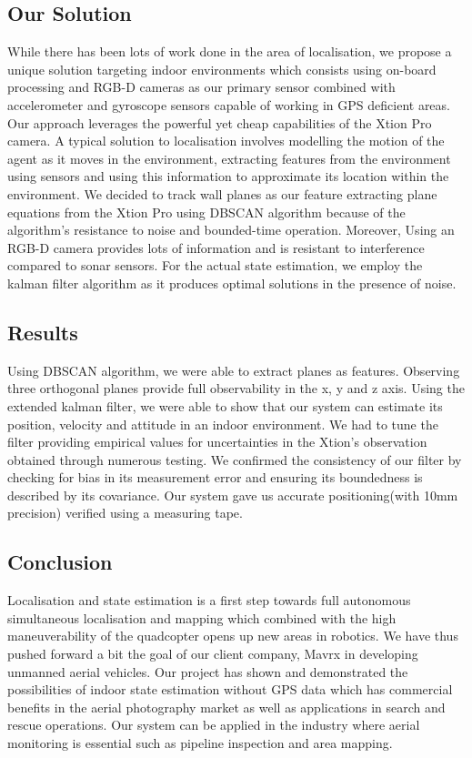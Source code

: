 \documentclass[]{article}
\begin{document}
{\subsection{Our Solution}
While there has been lots of work done in the area of localisation, we propose a unique solution targeting indoor environments which consists using on-board processing and RGB-D cameras as our primary sensor combined with accelerometer and gyroscope sensors capable of working in GPS deficient areas. Our approach leverages the powerful yet cheap capabilities of the Xtion Pro camera. A typical solution to localisation involves modelling the motion of the agent as it moves in the environment, extracting features from the environment using sensors and using this information to approximate its location within the environment. We decided to track wall planes as our feature extracting plane equations from the Xtion Pro using DBSCAN algorithm because of the algorithm's resistance to noise and bounded-time operation. Moreover, Using an RGB-D camera provides lots of information and is resistant to interference compared to sonar sensors. For the actual state estimation, we employ the kalman filter algorithm as it produces optimal solutions in the presence of noise.  
\subsection{Results}
Using DBSCAN algorithm, we were able to extract planes as features. Observing three orthogonal planes provide full observability in the x, y and z axis. Using the extended kalman filter, we were able to show that our system can estimate its position, velocity and attitude in an indoor environment. We had to tune the filter providing empirical values for uncertainties in the Xtion's observation obtained through numerous testing. We confirmed the consistency of our filter by checking for bias in its measurement error and ensuring its boundedness is described by its covariance. Our system gave us accurate positioning(with 10mm precision) verified using a measuring tape. 

\subsection{Conclusion}
Localisation and state estimation is a first step towards full autonomous simultaneous localisation and mapping which combined with the high maneuverability of the quadcopter opens up new areas in robotics. We have thus pushed forward a bit the goal of our client company, Mavrx in developing unmanned aerial vehicles. Our project has shown and demonstrated the possibilities of indoor state estimation without GPS data which has commercial benefits in the aerial photography market as well as applications in search and rescue operations. Our system can be applied in the industry where aerial monitoring is essential such as pipeline inspection and area mapping.  

}
\end{document}

